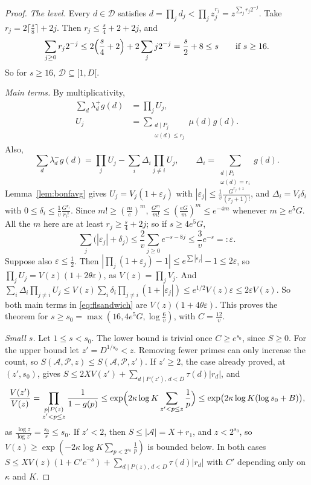 \begin{proof}
\emph{The level.} Every $d\in\mathcal D$ satisfies $d=\prod_jd_j<\prod_jz_j^{r_j}=z^{\sum_jr_j2^{-j}}$. Take $r_j=2\lceil\frac s8\rceil+2j$. Then $r_j\le\frac s4+2+2j$, and
\[
\sum_{j\ge0}r_j2^{-j}\le2\Bigl(\frac s4+2\Bigr)+2\sum_jj2^{-j}=\frac s2+8\le s\qquad\text{if }s\ge16.
\]
So for $s\ge16$, $\mathcal D\subseteq[1,D[$.

\emph{Main terms.} By multiplicativity,
\[
\begin{aligned}
\sum_d\lambda^+_dg(d)&=\prod_jU_j,\\
U_j&=\sum_{\substack{d\mid P_j\\\omega(d)\le r_j}}\mu(d)g(d).
\end{aligned}
\]
Also,
\[
\sum_d\lambda^-_dg(d)=\prod_jU_j-\sum_i\Delta_i\prod_{j\ne i}U_j,\qquad\Delta_i=\sum_{\substack{d\mid P_i\\\omega(d)=r_i}}g(d).
\]
Lemma~\ref{lem:bonfavg} gives $U_j=V_j(1+\varepsilon_j)$ with $|\varepsilon_j|\le\frac1v\frac{G^{r_j+1}}{(r_j+1)!}$, and $\Delta_i=V_i\delta_i$ with $0\le\delta_i\le\frac1v\frac{G^{r_i}}{r_i!}$. Since $m!\ge(\frac me)^m$, $\frac{G^m}{m!}\le(\frac{eG}m)^m\le e^{-4m}$ whenever $m\ge e^5G$. All the $m$ here are at least $r_j\ge\frac s4+2j$; so if $s\ge4e^5G$,
\[
\sum_j\bigl(|\varepsilon_j|+\delta_j\bigr)\le\frac2v\sum_{j\ge0}e^{-s-8j}\le\frac3ve^{-s}=:\varepsilon.
\]
Suppose also $\varepsilon\le\frac12$. Then $|\prod_j(1+\varepsilon_j)-1|\le e^{\sum|\varepsilon_j|}-1\le2\varepsilon$, so $\prod_jU_j=V(z)(1+2\theta\varepsilon)$, as $V(z)=\prod_jV_j$. And $\sum_i\Delta_i\prod_{j\ne i}U_j\le V(z)\sum_i\delta_i\prod_{j\ne i}(1+|\varepsilon_j|)\le e^{1/2}V(z)\varepsilon\le2\varepsilon V(z)$. So both main terms in \eqref{eq:flsandwich} are $V(z)(1+4\theta\varepsilon)$. This proves the theorem for $s\ge s_0=\max(16,4e^5G,\log\frac6v)$, with $C=\frac{12}v$.

\emph{Small $s$.} Let $1\le s<s_0$. The lower bound is trivial once $C\ge e^{s_0}$, since $S\ge0$. For the upper bound let $z'=D^{1/s_0}<z$. Removing fewer primes can only increase the count, so $S(\mathcal A,\mathcal P,z)\le S(\mathcal A,\mathcal P,z')$. If $z'\ge2$, the case already proved, at $(z',s_0)$, gives $S\le2XV(z')+\sum_{d\mid P(z'),\,d<D}\tau(d)|r_d|$, and
\[
\frac{V(z')}{V(z)}=\prod_{\substack{p\mid P(z)\\z'<p\le z}}\frac1{1-g(p)}\le\exp\Bigl(2\kappa\log K\sum_{z'<p\le z}\frac1p\Bigr)\le\exp\bigl(2\kappa\log K(\log s_0+B)\bigr),
\]
as $\frac{\log z}{\log z'}=\frac{s_0}s\le s_0$. If $z'<2$, then $S\le|\mathcal A|=X+r_1$, and $z<2^{s_0}$, so $V(z)\ge\exp(-2\kappa\log K\sum_{p<2^{s_0}}\frac1p)$ is bounded below. In both cases $S\le XV(z)(1+C'e^{-s})+\sum_{d\mid P(z),\,d<D}\tau(d)|r_d|$ with $C'$ depending only on $\kappa$ and $K$.
\end{proof}

